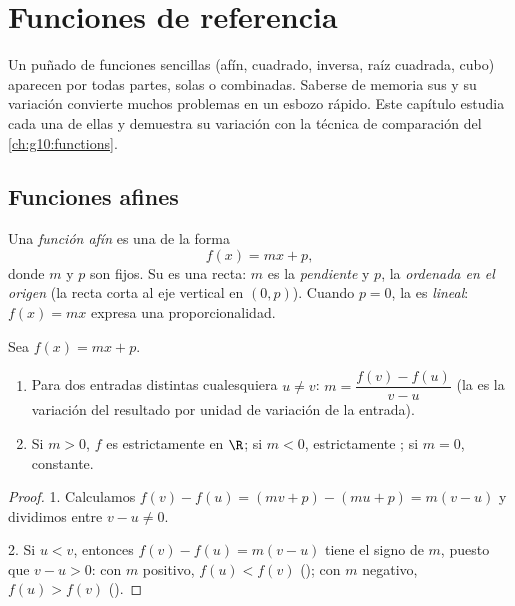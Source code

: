 \chapter{Funciones de referencia}\label{ch:g10:reffunc}

Un puñado de funciones sencillas (afín, cuadrado, inversa, raíz cuadrada,
cubo) aparecen por todas partes, solas o combinadas. Saberse de memoria sus
 y su variación convierte muchos problemas en un esbozo rápido.
Este capítulo estudia cada una de ellas y demuestra su variación con la
técnica de comparación del \cref{ch:g10:functions}.

\section{Funciones afines}

\begin{definition}\label{def:g10:reffunc:affine}
Una \emph{función afín} es una  de la forma
\[
f(x) = mx + p,
\]
donde $m$ y $p$ son  fijos. Su  es una recta: $m$ es
la \emph{pendiente} y $p$, la \emph{ordenada en el
origen} (la recta corta al eje vertical en
$(0, p)$). Cuando $p = 0$, la  es \emph{lineal}: $f(x) = mx$
expresa una proporcionalidad.
\end{definition}

\begin{proposition}\label{prop:g10:reffunc:affine}
Sea $f(x) = mx + p$.
\begin{enumerate}
  \item Para dos entradas distintas cualesquiera $u \neq v$:
        $m = \dfrac{f(v) - f(u)}{v - u}$ (la  es la variación del
        resultado por unidad de variación de la entrada).
  \item Si $m > 0$, $f$ es estrictamente  en $\R$; si $m < 0$,
        estrictamente ; si $m = 0$, constante.
\end{enumerate}
\end{proposition}

\begin{proof}
1. Calculamos $f(v) - f(u) = (mv + p) - (mu + p) = m(v - u)$ y dividimos
entre $v - u \neq 0$.

2. Si $u < v$, entonces $f(v) - f(u) = m(v-u)$ tiene el signo de $m$,
puesto que $v - u > 0$: con $m$ positivo, $f(u) < f(v)$ (); con
$m$ negativo, $f(u) > f(v)$ ().
\end{proof}

